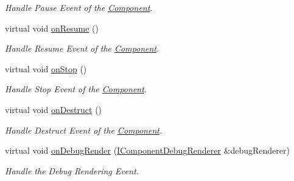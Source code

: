 \begin{DoxyCompactItemize}
\begin{DoxyCompactList}\small\item\em Handle Pause Event of the \hyperlink{class_i_dream_sky_1_1_component}{Component}. \end{DoxyCompactList}\item 
virtual void \hyperlink{class_i_dream_sky_1_1_component_1_1_owner_a39c9e675f1d601b7870d488ce252648d}{on\+Resume} ()\hypertarget{class_i_dream_sky_1_1_component_1_1_owner_a39c9e675f1d601b7870d488ce252648d}{}\label{class_i_dream_sky_1_1_component_1_1_owner_a39c9e675f1d601b7870d488ce252648d}

\begin{DoxyCompactList}\small\item\em Handle Resume Event of the \hyperlink{class_i_dream_sky_1_1_component}{Component}. \end{DoxyCompactList}\item 
virtual void \hyperlink{class_i_dream_sky_1_1_component_1_1_owner_aa8c589d7b7fb8f60e7fb446ca11c2197}{on\+Stop} ()\hypertarget{class_i_dream_sky_1_1_component_1_1_owner_aa8c589d7b7fb8f60e7fb446ca11c2197}{}\label{class_i_dream_sky_1_1_component_1_1_owner_aa8c589d7b7fb8f60e7fb446ca11c2197}

\begin{DoxyCompactList}\small\item\em Handle Stop Event of the \hyperlink{class_i_dream_sky_1_1_component}{Component}. \end{DoxyCompactList}\item 
virtual void \hyperlink{class_i_dream_sky_1_1_component_1_1_owner_a69a0f99352424f71532a8955d518da62}{on\+Destruct} ()\hypertarget{class_i_dream_sky_1_1_component_1_1_owner_a69a0f99352424f71532a8955d518da62}{}\label{class_i_dream_sky_1_1_component_1_1_owner_a69a0f99352424f71532a8955d518da62}

\begin{DoxyCompactList}\small\item\em Handle Destruct Event of the \hyperlink{class_i_dream_sky_1_1_component}{Component}. \end{DoxyCompactList}\item 
virtual void \hyperlink{class_i_dream_sky_1_1_component_1_1_owner_a804bdbbd90faa6014838050fb8594b5e}{on\+Debug\+Render} (\hyperlink{class_i_dream_sky_1_1_i_component_debug_renderer}{I\+Component\+Debug\+Renderer} \&debug\+Renderer)\hypertarget{class_i_dream_sky_1_1_component_1_1_owner_a804bdbbd90faa6014838050fb8594b5e}{}\label{class_i_dream_sky_1_1_component_1_1_owner_a804bdbbd90faa6014838050fb8594b5e}

\begin{DoxyCompactList}\small\item\em Handle the Debug Rendering Event. \end{DoxyCompactList}\end{DoxyCompactItemize}
